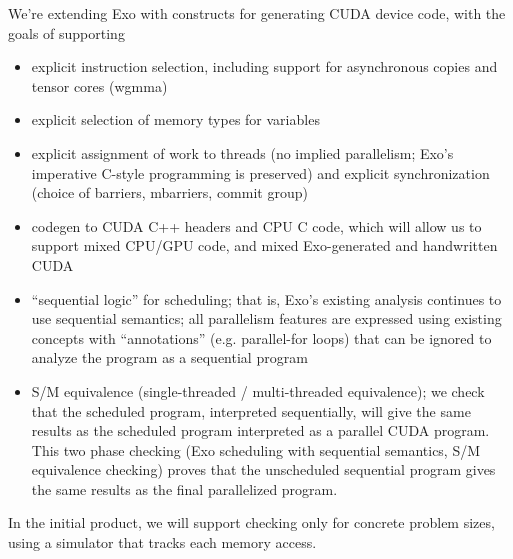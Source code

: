We're extending Exo with constructs for generating CUDA device code, with the goals of supporting
\begin{itemize}
  \item explicit instruction selection, including support for asynchronous copies and tensor cores (wgmma)
  \filbreak
  \item explicit selection of memory types for variables
  \filbreak
  \item explicit assignment of work to threads (no implied parallelism; Exo's imperative C-style programming is preserved) and explicit synchronization (choice of barriers, mbarriers, commit group)
  \filbreak
  \item codegen to CUDA C++ headers and CPU C code, which will allow us to support mixed CPU/GPU code, and mixed Exo-generated and handwritten CUDA
  \filbreak
  \item ``sequential logic'' for scheduling; that is, Exo's existing analysis continues to use sequential semantics;
    all parallelism features are expressed using existing concepts with ``annotations'' (e.g. parallel-for loops) that can be ignored to analyze the program as a sequential program
  \filbreak
\item S/M equivalence (single-threaded / multi-threaded equivalence); we check that the scheduled program, interpreted sequentially, will give the same results as the scheduled program interpreted as a parallel CUDA program.
    This two phase checking (Exo scheduling with sequential semantics, S/M equivalence checking) proves that the unscheduled sequential program gives the same results as the final parallelized program.
\end{itemize}
\filbreak
In the initial product, we will support checking only for concrete problem sizes, using a simulator that tracks each memory access.
\filbreak

